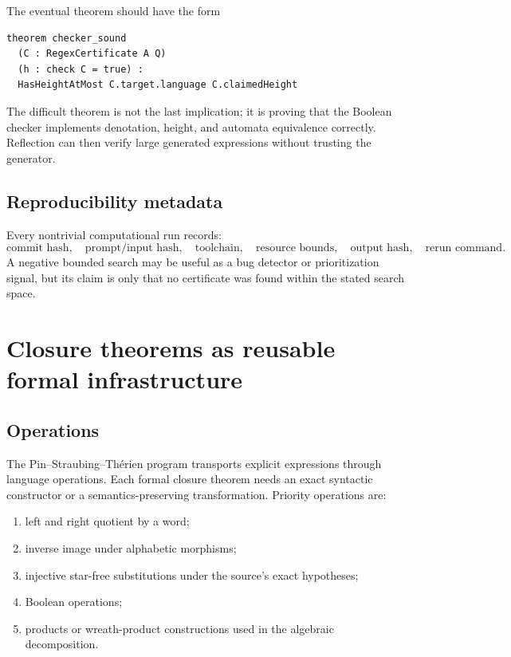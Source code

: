 \documentclass{amsart}
\begin{document}
The eventual theorem should have the form
\begin{lstlisting}[language={},caption={Soundness boundary, schematic Lean.}]
theorem checker_sound
  (C : RegexCertificate A Q)
  (h : check C = true) :
  HasHeightAtMost C.target.language C.claimedHeight
\end{lstlisting}
The difficult theorem is not the last implication; it is proving that the Boolean checker implements denotation, height, and automata equivalence correctly.  Reflection can then verify large generated expressions without trusting the generator.

\subsection{Reproducibility metadata}

Every nontrivial computational run records:
\[
\text{commit hash},\quad
\text{prompt/input hash},\quad
\text{toolchain},\quad
\text{resource bounds},\quad
\text{output hash},\quad
\text{rerun command}.
\]
A negative bounded search may be useful as a bug detector or prioritization signal, but its claim is only that no certificate was found within the stated search space.

\section{Closure theorems as reusable formal infrastructure}

\subsection{Operations}

The Pin--Straubing--Th\'erien program transports explicit expressions through language operations.  Each formal closure theorem needs an exact syntactic constructor or a semantics-preserving transformation.  Priority operations are:
\begin{enumerate}
  \item left and right quotient by a word;
  \item inverse image under alphabetic morphisms;
  \item injective star-free substitutions under the source's exact hypotheses;
  \item Boolean operations;
  \item products or wreath-product constructions used in the algebraic decomposition.
\end{enumerate}
\end{document}
